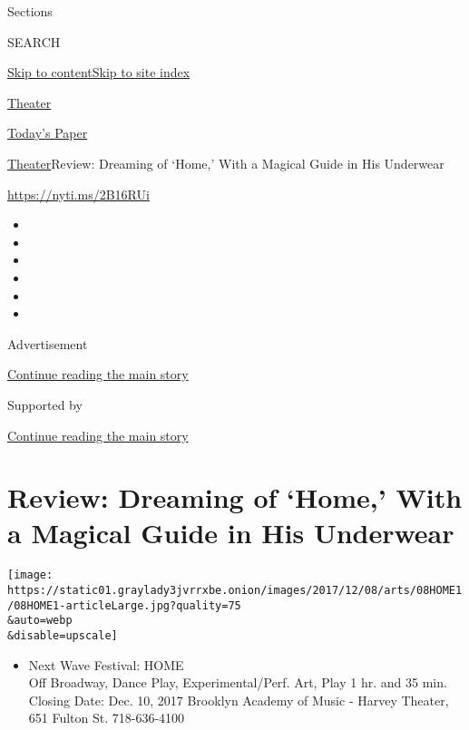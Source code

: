 Sections

SEARCH

\protect\hyperlink{site-content}{Skip to
content}\protect\hyperlink{site-index}{Skip to site index}

\href{https://www.nytimes3xbfgragh.onion/section/theater}{Theater}

\href{https://myaccount.nytimes3xbfgragh.onion/auth/login?response_type=cookie\&client_id=vi}{}

\href{https://www.nytimes3xbfgragh.onion/section/todayspaper}{Today's
Paper}

\href{/section/theater}{Theater}\textbar{}Review: Dreaming of `Home,'
With a Magical Guide in His Underwear

\url{https://nyti.ms/2B16RUi}

\begin{itemize}
\item
\item
\item
\item
\item
\item
\end{itemize}

Advertisement

\protect\hyperlink{after-top}{Continue reading the main story}

Supported by

\protect\hyperlink{after-sponsor}{Continue reading the main story}

\hypertarget{review-dreaming-of-home-with-a-magical-guide-in-his-underwear}{%
\section{Review: Dreaming of `Home,' With a Magical Guide in His
Underwear}\label{review-dreaming-of-home-with-a-magical-guide-in-his-underwear}}

\texttt{[image: https://static01.graylady3jvrrxbe.onion/images/2017/12/08/arts/08HOME1/08HOME1-articleLarge.jpg?quality=75\\\&auto=webp\\\&disable=upscale]}

\begin{itemize}
\tightlist
\item
  Next Wave Festival: HOME\\
  Off Broadway, Dance Play, Experimental/Perf. Art, Play 1 hr. and 35
  min. Closing Date: Dec. 10, 2017 Brooklyn Academy of Music - Harvey
  Theater, 651 Fulton St. 718-636-4100
\end{itemize}

